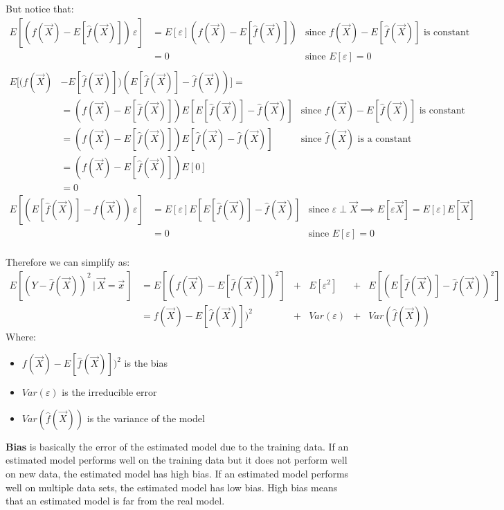       But notice that:
      \begin{align*}
        E[(f(\vec{X}) - E[\hat{f}(\vec{X})])\,\varepsilon] 
        & = E[\varepsilon](f(\vec{X}) - E[\hat{f}(\vec{X})]) 
        & \text{since } f(\vec{X}) - E[\hat{f}(\vec{X})] \text{ is constant}\\
        & = 0
        & \text{since } E[\varepsilon] = 0 \\
      \end{align*}
      \begin{align*}
        E[(f(\vec{X}) & - E[\hat{f}(\vec{X})])(E[\hat{f}(\vec{X})] - \hat{f}(\vec{X}))] = \\
                      & = (f(\vec{X}) - E[\hat{f}(\vec{X})])E[E[\hat{f}(\vec{X})] - \hat{f}(\vec{X})]
                      & \text{since } f(\vec{X}) - E[\hat{f}(\vec{X})] \text{ is constant} \\
                      & = (f(\vec{X}) - E[\hat{f}(\vec{X})])E[ \hat{f}(\vec{X}) - \hat{f}(\vec{X})]
                      & \text{since } \hat{f}(\vec{X}) \text{ is a constant} \\
                      & = (f(\vec{X}) - E[\hat{f}(\vec{X})])E[0] \\
                      & = 0
      \end{align*}
      \begin{align*}
        E[(E[\hat{f}(\vec{X})] - \hat{f}(\vec{X}))\,\varepsilon]
        & = E[\varepsilon]E[E[\hat{f}(\vec{X})] - \hat{f}(\vec{X})]
        & \text{since } \varepsilon \perp \vec{X} \implies E[\varepsilon\vec{X}] = E[\varepsilon]E[\vec{X}]\\
        & = 0
        & \text{since } E[\varepsilon] = 0 \\
      \end{align*}
      
      Therefore we can simplify as:
      \begin{align*}
      E[(Y-\hat{f}(\vec{X}))^2 \,|\, \vec{X} = \vec{x}\,]
      & = E[(f(\vec{X}) - E[\hat{f}(\vec{X})])^2] &+ &E[\varepsilon^2] &+ &E[(E[\hat{f}(\vec{X})] - \hat{f}(\vec{X}))^2] \\
      & = f(\vec{X}) - E[\hat{f}(\vec{X})])^2 &+ &Var(\varepsilon) &+ &Var(\hat{f}(\vec{X})) 
      \end{align*} 
      Where:
      \begin{itemize}
        \item $f(\vec{X}) - E[\hat{f}(\vec{X})])^2$ is the bias
        \item $Var(\varepsilon)$ is the irreducible error
        \item $Var(\hat{f}(\vec{X}))$ is the variance of the model
      \end{itemize}
      \textbf{Bias} is basically the error of the estimated model due to the training data. If an estimated model performs well on the training data but it does not perform well on new data, the estimated model has high bias. If an estimated model performs well on multiple data sets, the estimated model has low bias. High bias means that an estimated model is far from the real model. 

